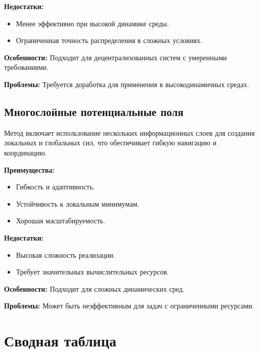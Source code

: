 \textbf{Недостатки:}
\begin{itemize}
	\item Менее эффективно при высокой динамике среды.
	\item Ограниченная точность распределения в сложных условиях.
\end{itemize}

\textbf{Особенности:} Подходит для децентрализованных систем с умеренными требованиями.

\textbf{Проблемы:} Требуется доработка для применения в высокодинамичных средах.

\subsection{Многослойные потенциальные поля}
Метод включает использование нескольких информационных слоев для создания локальных и глобальных сил, что обеспечивает гибкую навигацию и координацию.

\textbf{Преимущества:}
\begin{itemize}
	\item Гибкость и адаптивность.
	\item Устойчивость к локальным минимумам.
	\item Хорошая масштабируемость.
\end{itemize}

\textbf{Недостатки:}
\begin{itemize}
	\item Высокая сложность реализации.
	\item Требует значительных вычислительных ресурсов.
\end{itemize}

\textbf{Особенности:} Подходит для сложных динамических сред.

\textbf{Проблемы:} Может быть неэффективным для задач с ограниченными ресурсами.

\section{Сводная таблица}

